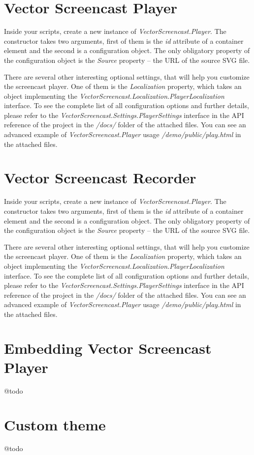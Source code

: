 \section{Vector Screencast Player}
Inside your scripts, create a new instance of \textit{VectorScreencast.Player}. The constructor takes two arguments, first of them is the \textit{id} attribute of a container element and the second is a configuration object. The only obligatory property of the configuration object is the \textit{Source} property -- the URL of the source SVG file. 

There are several other interesting optional settings, that will help you customize the screencast player. One of them is the \textit{Localization} property, which takes an object implementing the \textit{VectorScreencast.Localization.PlayerLocalization} interface. To see the complete list of all configuration options and further details, please refer to the \textit{VectorScreencast.Settings.PlayerSettings} interface in the API reference of the project in the \textit{/docs/} folder of the attached files. You can see an advanced example of \textit{VectorScreencast.Player} usage \textit{/demo/public/play.html} in the attached files.

\section{Vector Screencast Recorder}

Inside your scripts, create a new instance of \textit{VectorScreencast.Player}. The constructor takes two arguments, first of them is the \textit{id} attribute of a container element and the second is a configuration object. The only obligatory property of the configuration object is the \textit{Source} property -- the URL of the source SVG file. 

There are several other interesting optional settings, that will help you customize the screencast player. One of them is the \textit{Localization} property, which takes an object implementing the \textit{VectorScreencast.Localization.PlayerLocalization} interface. To see the complete list of all configuration options and further details, please refer to the \textit{VectorScreencast.Settings.PlayerSettings} interface in the API reference of the project in the \textit{/docs/} folder of the attached files. You can see an advanced example of \textit{VectorScreencast.Player} usage \textit{/demo/public/play.html} in the attached files.


\section{Embedding Vector Screencast Player}
@todo

\section{Custom theme}
@todo